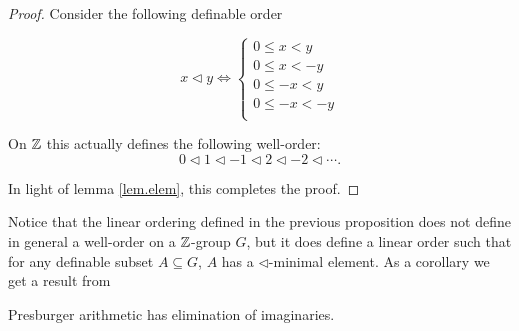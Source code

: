 \begin{proof}
Consider the following definable order

\[x\lhd y \Leftrightarrow 
\begin{cases}
0\leq x<y \\
0\leq x<-y \\
0\leq -x<y\\
0\leq -x<-y \\
\end{cases}
\]

On ${\mathbb Z}$ this actually defines the following well-order: 
$$0 \lhd 1 \lhd -1 \lhd 2 \lhd -2 \lhd \cdots  .$$

In light of lemma \ref{lem.elem}, this completes the proof. 
\end{proof}

Notice that the linear ordering defined in the previous proposition does not define in general a well-order on a ${\mathbb Z}$-group $G$, but it does define a linear order such that for any definable subset $A\subseteq G$, $A$ has a $\lhd$-minimal element. As a corollary we get a result from \cite{clu-presb03} 

\begin{cor}
Presburger arithmetic has elimination of imaginaries. 
\end{cor}